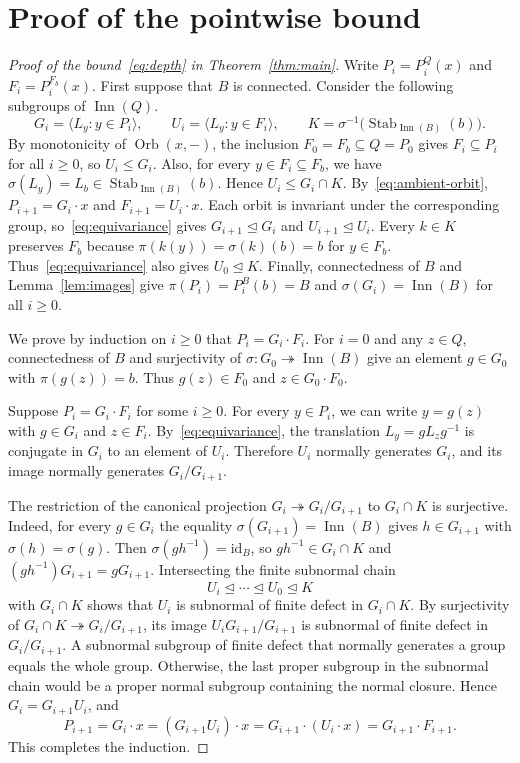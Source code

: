 \documentclass[11pt,a4paper]{article}
\theoremstyle{remark}
\newcommand{\Inn}{\operatorname{Inn}}
\newcommand{\Orb}{\operatorname{Orb}}
\newcommand{\Stab}{\operatorname{Stab}}
\begin{document}
\section{Proof of the pointwise bound}\label{sec:quandles}

\begin{proof}[Proof of the bound~\eqref{eq:depth} in Theorem~\ref{thm:main}]
Write \(P_i=P_i^Q(x)\) and \(F_i=P_i^{F_b}(x)\). First suppose that
\(B\) is connected. Consider the following subgroups of \(\Inn(Q)\).
\[
  G_i=\langle L_y : y\in P_i\rangle,\qquad
  U_i=\langle L_y : y\in F_i\rangle,\qquad
  K=\sigma^{-1}\bigl(\Stab_{\Inn(B)}(b)\bigr).
\]
By monotonicity of \(\Orb(x,-)\), the inclusion \(F_0=F_b\subseteq Q=P_0\)
gives \(F_i\subseteq P_i\) for all \(i\ge 0\), so \(U_i\le G_i\).
Also, for every \(y\in F_i\subseteq F_b\), we have
\(\sigma(L_y)=L_b\in\Stab_{\Inn(B)}(b)\). Hence \(U_i\le G_i\cap K\).
By~\eqref{eq:ambient-orbit}, \(P_{i+1}=G_i\cdot x\) and
\(F_{i+1}=U_i\cdot x\). Each orbit is invariant under the corresponding
group, so~\eqref{eq:equivariance} gives \(G_{i+1}\trianglelefteq G_i\)
and \(U_{i+1}\trianglelefteq U_i\). Every \(k\in K\) preserves \(F_b\)
because \(\pi(k(y))=\sigma(k)(b)=b\) for \(y\in F_b\).
Thus~\eqref{eq:equivariance} also gives \(U_0\trianglelefteq K\).
Finally, connectedness of \(B\) and Lemma~\ref{lem:images} give
\(\pi(P_i)=P_i^B(b)=B\) and \(\sigma(G_i)=\Inn(B)\) for all \(i\ge 0\).

We prove by induction on \(i\ge 0\) that \(P_i=G_i\cdot F_i\).
For \(i=0\) and any \(z\in Q\), connectedness of \(B\) and surjectivity
of \(\sigma\colon G_0\twoheadrightarrow\Inn(B)\) give an element
\(g\in G_0\) with \(\pi(g(z))=b\). Thus \(g(z)\in F_0\) and
\(z\in G_0\cdot F_0\).

Suppose \(P_i=G_i\cdot F_i\) for some \(i\ge 0\). For every
\(y\in P_i\), we can write \(y=g(z)\) with \(g\in G_i\) and \(z\in F_i\).
By~\eqref{eq:equivariance}, the translation \(L_y=gL_zg^{-1}\) is
conjugate in \(G_i\) to an element of \(U_i\). Therefore \(U_i\) normally
generates \(G_i\), and its image normally generates \(G_i/G_{i+1}\).

The restriction of the canonical projection
\(G_i\twoheadrightarrow G_i/G_{i+1}\) to \(G_i\cap K\) is surjective.
Indeed, for every \(g\in G_i\) the equality
\(\sigma(G_{i+1})=\Inn(B)\) gives \(h\in G_{i+1}\) with
\(\sigma(h)=\sigma(g)\). Then \(\sigma(gh^{-1})=\mathrm{id}_B\), so
\(gh^{-1}\in G_i\cap K\) and \((gh^{-1})G_{i+1}=gG_{i+1}\).
Intersecting the finite subnormal chain
\[
  U_i\trianglelefteq\cdots\trianglelefteq U_0\trianglelefteq K
\]
with \(G_i\cap K\) shows that \(U_i\) is subnormal of finite defect in
\(G_i\cap K\). By surjectivity of \(G_i\cap K\twoheadrightarrow G_i/G_{i+1}\),
its image \(U_iG_{i+1}/G_{i+1}\) is subnormal of finite defect in
\(G_i/G_{i+1}\). A subnormal subgroup of finite defect that normally
generates a group equals the whole group. Otherwise, the last proper
subgroup in the subnormal chain would be a proper normal subgroup
containing the normal closure. Hence \(G_i=G_{i+1}U_i\), and
\[
  P_{i+1}=G_i\cdot x=(G_{i+1}U_i)\cdot x
  =G_{i+1}\cdot(U_i\cdot x)=G_{i+1}\cdot F_{i+1}.
\]
This completes the induction.


\end{proof}
\end{document}

